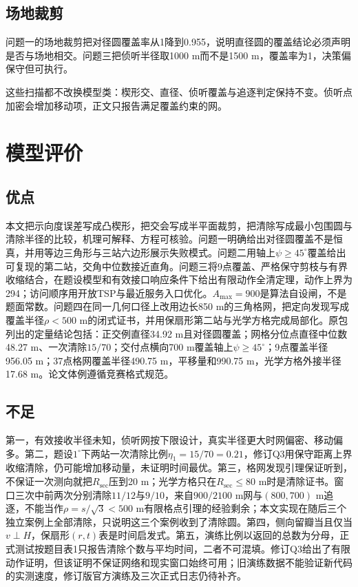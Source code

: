 \documentclass{cumcmthesis}
\begin{document}
\subsection{场地裁剪}

问题一的场地裁剪把对径圆覆盖率从1降到0.955，说明直径圆的覆盖结论必须声明是否与场地相交。问题三把侦听半径取1000 m而不是1500 m，覆盖率为1，决策偏保守但可执行。

这些扫描都不改换模型类：楔形交、直径、侦听覆盖与追逐判定保持不变。侦听点加密会增加移动项，正文只报告满足覆盖约束的网。

\section{模型评价}

\subsection{优点}

本文把示向度误差写成凸楔形，把交会写成半平面裁剪，把清除写成最小包围圆与清除半径的比较，机理可解释、方程可核验。问题一明确给出对径圆覆盖不是恒真，并用等边三角形与三站六边形展示失败模式。问题二用轴上$\psi\ge 45^\circ$覆盖给出可复现的第二站，交角中位数接近直角。问题三将9点覆盖、严格保守剪枝与有界收缩结合，在题设模型和有效接口响应条件下给出有限动作全清定理，动作上界为294；访问顺序用开放TSP与最近服务入口优化。$A_{\max}=900$是算法自设闸，不是题面常数。问题四在同一几何口径上改用边长850 m的三角格网，把定向发现写成覆盖半径$\rho<500$ m的闭式证书，并用保扇形第二站与光学方格完成局部化。原包列出的定量结论包括：正交例直径34.92 m且对径圆覆盖；网格分位点直径中位数48.27 m、一次清除$15/70$；交付点横向700 m覆盖轴上$\psi\ge 45^\circ$；9点覆盖半径956.05 m；37点格网覆盖半径490.75 m，平移量和990.75 m，光学方格外接半径17.68 m。论文体例遵循竞赛格式规范\cite{format}。

\subsection{不足}

第一，有效接收半径未知，侦听网按下限设计，真实半径更大时网偏密、移动偏多。第二，题设$1^\circ$下两站一次清除比例$\eta_1=15/70=0.21$，修订Q3用保守距离上界收缩清除，仍可能增加移动量，未证明时间最优。第三，格网发现引理保证听到，不保证一次测向就把$R_{\mathrm{sec}}$压到20 m；光学方格只在$R_{\mathrm{sec}}\le 80$ m时是清除证书。窗口三次中前两次分别清除$11/12$与$9/10$，来自$900/2100$ m网与$(800,700)$ m追逐，不能当作$\rho=s/\sqrt{3}<500$ m有限格点引理的经验剩余；本文实现在随后三个独立案例上全部清除，只说明这三个案例收到了清除圆。第四，侧向留瓣当且仅当$v\perp H$，保扇形$(r,t)$表是时间启发式。第五，演练比例以返回的总数为分母，正式测试按题目表1只报告清除个数与平均时间，二者不可混填。修订Q3给出了有限动作证明，但该证明不保证网络和现实窗口始终可用；旧演练数据不能验证新代码的实测速度，修订版官方演练及三次正式日志仍待补齐。
\end{document}
